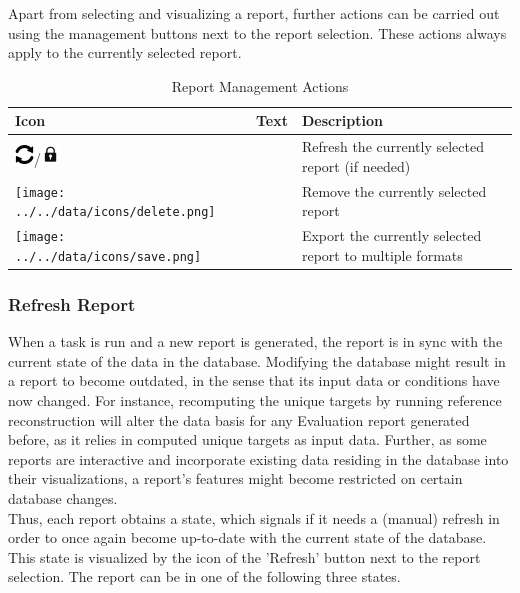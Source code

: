 Apart from selecting and visualizing a report, further actions can be carried out using the management buttons next to the 
report selection. These actions always apply to the currently selected report.

\begin{table}[H]
    \center
    \begin{tabular}{ | l | l | l |}
      \hline
      \textbf{Icon} & \textbf{Text} & \textbf{Description} \\ \hline
      \includegraphics[width=0.5cm,frame]{../../data/icons/refresh.png}/\includegraphics[width=0.5cm,frame]{../../data/icons/lock.png} & \nameref{sec:report_refresh} & Refresh the currently selected report (if needed) \\ \hline
      \texttt{[image: ../../data/icons/delete.png]} & \nameref{sec:report_delete} & Remove the currently selected report \\ \hline
      \texttt{[image: ../../data/icons/save.png]} & \nameref{sec:report_export} & Export the currently selected report to multiple formats \\ \hline
    \end{tabular}
    \caption{Report Management Actions}
\end{table}

\subsubsection{Refresh Report}
\label{sec:report_refresh}

When a task is run and a new report is generated, the report is in sync with the current state of the data in the database.
Modifying the database might result in a report to become outdated, in the sense that its input data or conditions have now changed.
For instance, recomputing the unique targets by running reference reconstruction will alter the data basis
for any Evaluation report generated before, as it relies in computed unique targets as input data. 
Further, as some reports are interactive and incorporate existing data residing in the database into their visualizations,
a report's features might become restricted on certain database changes. \\

Thus, each report obtains a state, which signals if it needs a (manual) refresh in order to once again become up-to-date with the current state of the database. 
This state is visualized by the icon of the 'Refresh' button next to the report selection. The report can be in one of the following three states. \\

